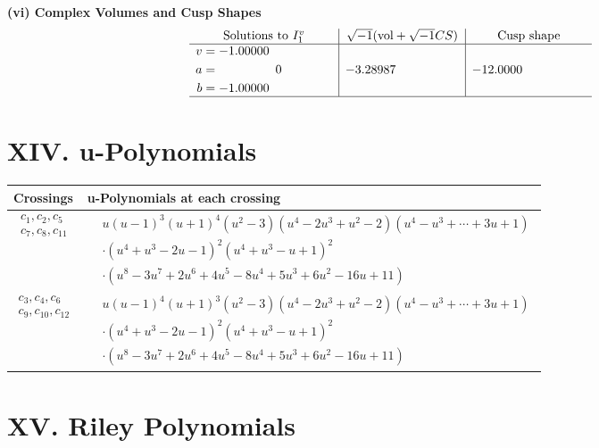 \documentclass[1p]{elsarticle_modified}
\theoremstyle{definition}
\newcommand{\I}{\sqrt{-1}}
\begin{document}
\newpage\flushleft \textbf{(vi) Complex Volumes and Cusp Shapes}
$$\begin{array}{c|c|c}  
\text{Solutions to }I^v_{1}& \I (\text{vol} + \sqrt{-1}CS) & \text{Cusp shape}\\
 \hline 
\begin{aligned}
v &= -1.00000\phantom{ +0.000000I} \\
a &= \phantom{-0.000000 } 0 \\
b &= -1.00000\phantom{ +0.000000I}\end{aligned}
 & -3.28987\phantom{ +0.000000I} & -12.0000\phantom{ +0.000000I}\\
 \hline 
 \end{array}$$\newpage
\newpage\renewcommand{\arraystretch}{1}
\centering \section*{ XIV. u-Polynomials}
\begin{tabular}{m{50pt}|m{274pt}}
Crossings & \hspace{64pt}u-Polynomials at each crossing \\
\hline $$\begin{aligned}c_{1},c_{2},c_{5}\\c_{7},c_{8},c_{11}\end{aligned}$$&$\begin{aligned}
&u(u-1)^3(u+1)^4(u^2-3)(u^{4}-2 u^{3}+u^{2}-2)(u^{4}-u^{3}+\cdots+3 u+1)\\
&\cdot(u^4+u^3-2 u-1)^2(u^4+u^3- u+1)^2\\
&\cdot(u^8-3 u^7+2 u^6+4 u^5-8 u^4+5 u^3+6 u^2-16 u+11)
\end{aligned}$\\
\hline $$\begin{aligned}c_{3},c_{4},c_{6}\\c_{9},c_{10},c_{12}\end{aligned}$$&$\begin{aligned}
&u(u-1)^4(u+1)^3(u^2-3)(u^{4}-2 u^{3}+u^{2}-2)(u^{4}-u^{3}+\cdots+3 u+1)\\
&\cdot(u^4+u^3-2 u-1)^2(u^4+u^3- u+1)^2\\
&\cdot(u^8-3 u^7+2 u^6+4 u^5-8 u^4+5 u^3+6 u^2-16 u+11)
\end{aligned}$\\
\hline
\end{tabular}\newpage\renewcommand{\arraystretch}{1}
\centering \section*{ XV. Riley Polynomials}
\end{document}
